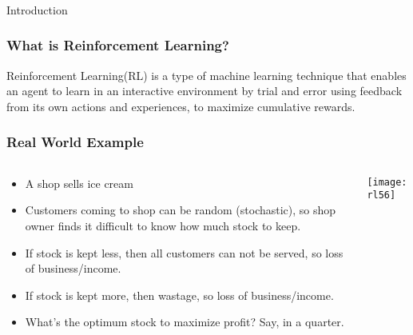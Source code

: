 \begin{frame}[fragile]\frametitle{}
\begin{center}
{\Large Introduction}
\end{center}
\end{frame}

\begin{frame}[fragile]\frametitle{What is Reinforcement Learning?}
Reinforcement Learning(RL) is a type of machine learning technique that enables an agent to learn in an interactive environment by trial and error using feedback from its own actions and experiences, to maximize cumulative rewards.


\end{frame}

\begin{frame}[fragile]\frametitle{Real World Example}

\begin{columns}
\begin{column}{0.5\textwidth}

\begin{itemize}
\item A shop sells ice cream
\item Customers coming to shop can be random (stochastic), so shop owner finds it difficult to know how much stock to keep.
\item If stock is kept less, then all customers can not be served, so loss of business/income.
\item If stock is kept more, then wastage, so loss of business/income.
\item What's the optimum stock to maximize profit? Say, in a quarter.
\end{itemize}

\end{column}
\begin{column}{0.5\textwidth}  %


\begin{center}
\texttt{[image: rl56]}
\end{center}
\end{column}
\end{columns}

\end{frame}


